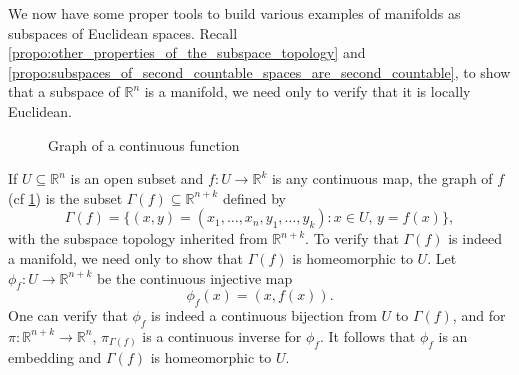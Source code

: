 \documentclass[notoc,notitlepage]{tufte-book}
\begin{document}
\begin{remark}\label{remark:we_are_ready_to_make_more_manifolds}
  We now have some proper tools to build various examples of manifolds as subspaces of Euclidean
  spaces. Recall \cref{propo:other_properties_of_the_subspace_topology} and
  \cref{propo:subspaces_of_second_countable_spaces_are_second_countable}, to show that a subspace
  of $\mathbb{R}^n$ is a manifold, we need only to verify that it is locally Euclidean.
\end{remark}

\begin{figure}[ht]
  \centering
  \caption{Graph of a continuous function}\label{fig:graph_of_a_continuous_function}
\end{figure}

\begin{eg}
  If $U \subseteq \mathbb{R}^n$ is an open subset and $f : U \to \mathbb{R}^k$ is any continuous
  map, the graph of $f$ (cf \cref{fig:graph_of_a_continuous_function}) is the subset $\Gamma(f)
  \subseteq \mathbb{R}^{n + k}$ defined by
  \begin{equation*}
    \Gamma(f) = \{(x, y) = (x_1, \ldots, x_n, y_1, \ldots, y_k) : x \in U, \, y = f(x)\},
  \end{equation*}
  with the subspace topology inherited from $\mathbb{R}^{n + k}$. To verify that $\Gamma(f)$ is
  indeed a manifold, we need only to show that $\Gamma(f)$ is homeomorphic to $U$. Let $\phi_f
  : U \to \mathbb{R}^{n + k}$ be the continuous injective map
  \begin{equation*}
    \phi_f(x) = (x, f(x)).
  \end{equation*}
  One can verify that $\phi_f$ is indeed a continuous bijection from $U$ to $\Gamma(f)$, and for
  $\pi : \mathbb{R}^{n + k} \to \mathbb{R}^n$, $\pi_{\Gamma(f)}$ is a continuous inverse for
  $\phi_f$. It follows that $\phi_f$ is an embedding and $\Gamma(f)$ is homeomorphic to $U$.
\end{eg}
\end{document}
